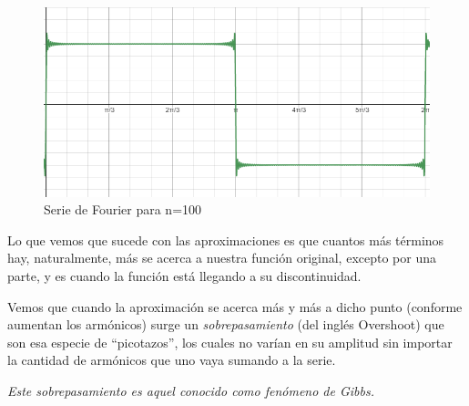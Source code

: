 \documentclass[../main.tex]{subfiles}
\begin{document}
	\begin{figure}[H]
		\centering
		\includegraphics[width=\textwidth]{fourier/volpa/image8.png}
		\caption{Serie de Fourier para n=100}
		\label{n100}
	\end{figure}
	Lo que vemos que sucede con las aproximaciones es que cuantos más
	términos hay, naturalmente, más se acerca a nuestra función original,
	excepto por una parte, y es cuando la función está llegando a su
	discontinuidad.

	Vemos que cuando la aproximación se acerca más y más a
	dicho punto (conforme aumentan los armónicos) surge un
	\emph{sobrepasamiento} (del inglés Overshoot) que son esa especie de
	``picotazos'', los cuales no varían en su amplitud sin importar la
	cantidad de armónicos que uno vaya sumando a la serie.

	\emph{Este sobrepasamiento es aquel conocido como fenómeno de Gibbs.}
\end{document}
